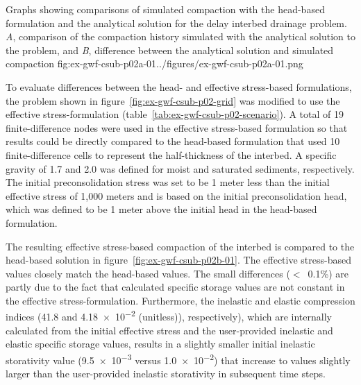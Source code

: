 \begin{StandardFigure}{
                                     Graphs showing comparisons of simulated compaction with the 
                                     head-based formulation and the analytical solution for the delay 
                                     interbed drainage problem. \textit{A}, comparison of the compaction 
                                     history simulated with the analytical solution to the problem, and 
                                     \textit{B}, difference between the analytical solution and simulated 
                                     compaction
                                     }{fig:ex-gwf-csub-p02a-01}{../figures/ex-gwf-csub-p02a-01.png}
\end{StandardFigure}         

To evaluate differences between the head- and effective stress-based formulations, the problem shown in figure~\ref{fig:ex-gwf-csub-p02-grid} was modified to use the effective stress-formulation (table~\ref{tab:ex-gwf-csub-p02-scenario}). A total of 19 finite-difference nodes were used in the effective stress-based formulation so that results could be directly compared to the head-based formulation that used 10 finite-difference cells to represent the half-thickness of the interbed. A specific gravity of 1.7 and 2.0 was defined for moist and saturated sediments, respectively. The initial preconsolidation stress was set to be 1 meter less than the initial effective stress of 1,000 meters and is based on the initial preconsolidation head, which was defined to be 1 meter above the initial head in the head-based formulation.

The resulting effective stress-based compaction of the interbed is compared to the head-based solution in figure~\ref{fig:ex-gwf-csub-p02b-01}. The effective stress-based values closely match the head-based values. The small differences ($<$~0.1\%) are partly due to the fact that calculated specific storage values are not constant in the effective stress-formulation. Furthermore, the inelastic and elastic compression indices (41.8 and \num{4.18e-2} (unitless)), respectively), which are internally calculated from the initial effective stress and the user-provided inelastic and elastic specific storage values, results in a slightly smaller initial inelastic storativity value (\num{9.5e-3} versus \num{1.0e-2}) that increase to values slightly larger than the user-provided inelastic storativity in subsequent time steps.

